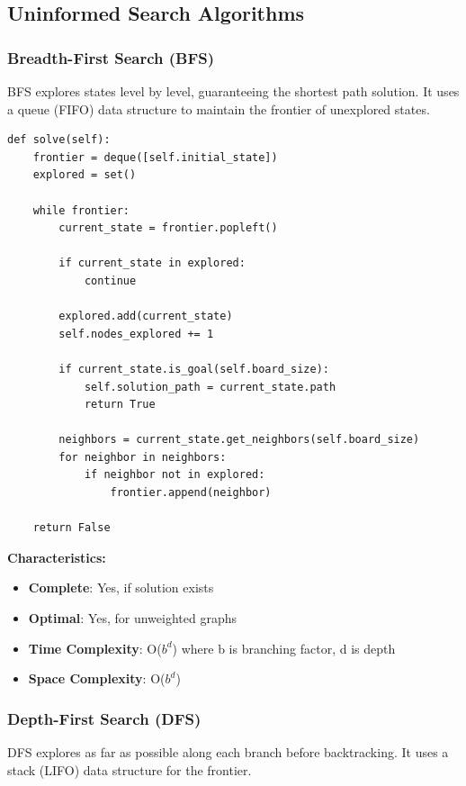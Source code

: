 \documentclass[11pt,a4paper]{article}
\begin{document}
\subsection{Uninformed Search Algorithms}

\subsubsection{Breadth-First Search (BFS)}

BFS explores states level by level, guaranteeing the shortest path solution. It uses a queue (FIFO) data structure to maintain the frontier of unexplored states.

\begin{lstlisting}[caption=BFS Core Implementation]
def solve(self):
    frontier = deque([self.initial_state])
    explored = set()
    
    while frontier:
        current_state = frontier.popleft()
        
        if current_state in explored:
            continue
            
        explored.add(current_state)
        self.nodes_explored += 1
        
        if current_state.is_goal(self.board_size):
            self.solution_path = current_state.path
            return True
            
        neighbors = current_state.get_neighbors(self.board_size)
        for neighbor in neighbors:
            if neighbor not in explored:
                frontier.append(neighbor)
                
    return False
\end{lstlisting}

\textbf{Characteristics:}
\begin{itemize}
\item \textbf{Complete}: Yes, if solution exists
\item \textbf{Optimal}: Yes, for unweighted graphs
\item \textbf{Time Complexity}: O($b^d$) where b is branching factor, d is depth
\item \textbf{Space Complexity}: O($b^d$)
\end{itemize}

\subsubsection{Depth-First Search (DFS)}

DFS explores as far as possible along each branch before backtracking. It uses a stack (LIFO) data structure for the frontier.
\end{document}
